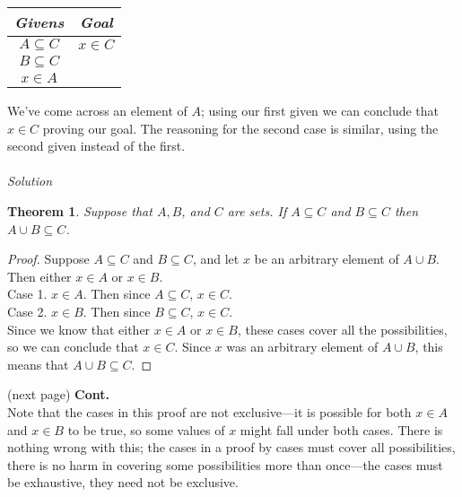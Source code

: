 \documentclass{report}
\newtheorem*{theorem}{Theorem}
\theoremstyle{definition}
\begin{document}
\begin{center}
\begin{tabular}{c|c}
\textit{Givens}&\textit{Goal}\\
\hline
$A\subseteq C$&$x\in C$\\
$B\subseteq C$&\\
$x\in A$&
\end{tabular}
\end{center}
We've come across an element of $A$; using our first given we can conclude that $x\in C$ proving our goal. The reasoning for the second case is similar, 
using the second given instead of the first.\\
\vspace{1mm}\\
\textit{Solution}
\begin{theorem}
Suppose that $A,B$, and $C$ are sets. If $A\subseteq C$ and $B\subseteq C$ then $A\cup B\subseteq C$.
\end{theorem}
\begin{proof}
Suppose $A\subseteq C$ and $B\subseteq C$, and let $x$ be an arbitrary element of $A\cup B$. Then either $x\in A$ or $x\in B$.\\
\indent Case 1. $x\in A$. Then since $A\subseteq C$, $x\in C$.\\
\indent Case 2. $x\in B$. Then since $B\subseteq C$, $x\in C$.\\
Since we know that either $x\in A$ or $x\in B$, these cases cover all the possibilities, so we can conclude that $x\in C$. Since $x$ was an arbitrary element of $A\cup B$, this means that 
$A\cup B\subseteq C$.
\end{proof}
\noindent(next page)\newpage
\noindent\textbf{Cont.}\\
Note that the cases in this proof are not exclusive---it is possible for both $x\in A$ and $x\in B$ to be true, so some values of $x$ might fall under both cases. There
is nothing wrong with this; the cases in a proof by cases must cover all possibilities, there is no harm in covering some possibilities more than once---the cases must be exhaustive, they need
not be exclusive.
\end{document}
